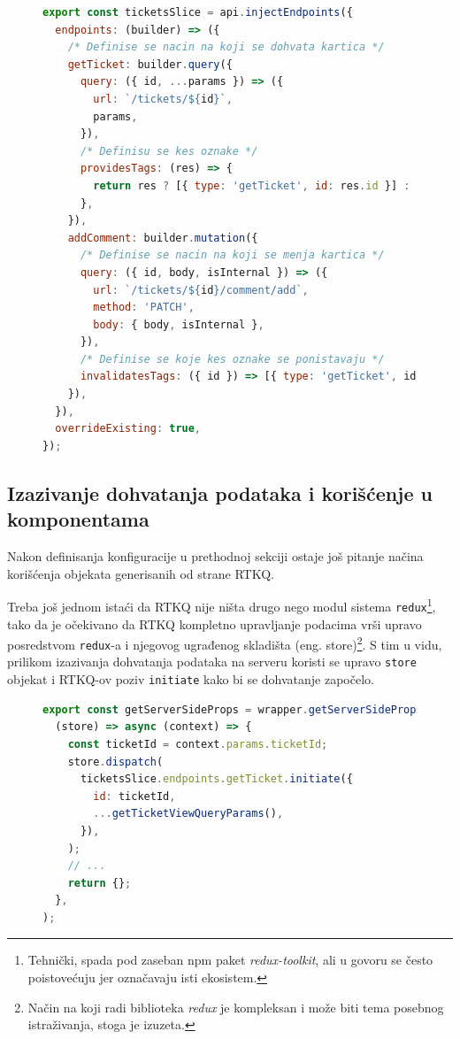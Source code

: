 \documentclass[12pt,oneside]{memoir}
\begin{document}
\begin{figure}[h]
\begin{lstlisting}[language=JavaScript, style=ES6, caption={Konfiguracija API poziva za dohvatanje kartice i dodavanje komentara.}, label={lst:rtkqconfigtickets}]
export const ticketsSlice = api.injectEndpoints({
  endpoints: (builder) => ({
    /* Definise se nacin na koji se dohvata kartica */
    getTicket: builder.query({
      query: ({ id, ...params }) => ({
        url: `/tickets/${id}`,
        params,
      }),
      /* Definisu se kes oznake */
      providesTags: (res) => {
        return res ? [{ type: 'getTicket', id: res.id }] : [];
      },
    }),
    addComment: builder.mutation({
      /* Definise se nacin na koji se menja kartica */
      query: ({ id, body, isInternal }) => ({
        url: `/tickets/${id}/comment/add`,
        method: 'PATCH',
        body: { body, isInternal },
      }),
      /* Definise se koje kes oznake se ponistavaju */
      invalidatesTags: ({ id }) => [{ type: 'getTicket', id }],
    }),
  }),
  overrideExisting: true,
});
\end{lstlisting}
\end{figure}

\subsection{Izazivanje dohvatanja podataka i korišćenje u komponentama}

Nakon definisanja konfiguracije u prethodnoj sekciji ostaje još pitanje načina korišćenja objekata generisanih od strane RTKQ.

Treba još jednom istaći da RTKQ nije ništa drugo nego modul sistema \verb|redux|\footnote{Tehnički, spada pod zaseban npm paket \textit{redux-toolkit}, ali u govoru se često poistovećuju jer označavaju isti ekosistem.}, tako da je očekivano da RTKQ kompletno upravljanje podacima vrši upravo posredstvom \verb|redux|-a i njegovog ugrađenog skladišta (eng. store)\footnote{Način na koji radi biblioteka \textit{redux} je kompleksan i može biti tema posebnog istraživanja, stoga je izuzeta.}. S tim u vidu, prilikom izazivanja dohvatanja podataka na serveru koristi se upravo \verb|store| objekat i RTKQ-ov poziv \verb|initiate| kako bi se dohvatanje započelo.

\begin{figure}[h]
\begin{lstlisting}[language=JavaScript, style=ES6, caption={Dohvatanje podataka o kartici na serveru.}]
export const getServerSideProps = wrapper.getServerSideProps(
  (store) => async (context) => {
    const ticketId = context.params.ticketId;
    store.dispatch(
      ticketsSlice.endpoints.getTicket.initiate({
        id: ticketId,
        ...getTicketViewQueryParams(),
      }),
    );
    // ...
    return {};
  },
);
\end{lstlisting}
\end{figure}
\end{document}
